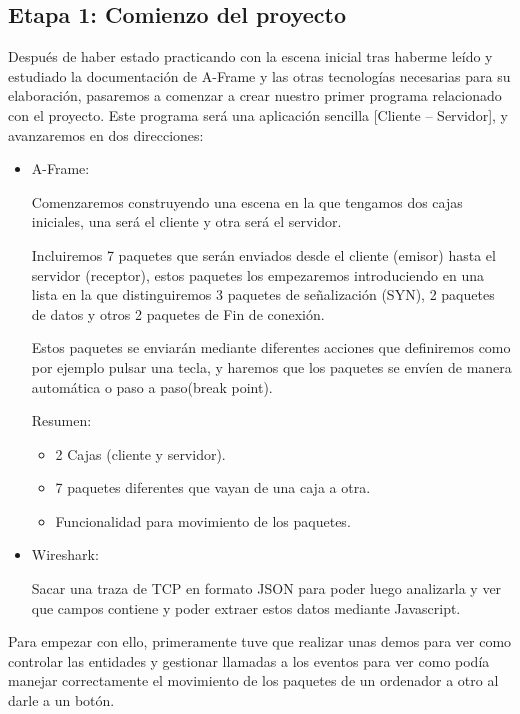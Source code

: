 \documentclass[a4paper, 12pt]{book}
\begin{document}
\newpage
\subsection{Etapa 1: Comienzo del proyecto}

Después de haber estado practicando con la escena inicial tras haberme leído y estudiado la documentación de A-Frame y las otras tecnologías necesarias para su elaboración, pasaremos a comenzar a crear nuestro primer programa relacionado con el proyecto.
Este programa será una aplicación sencilla [Cliente – Servidor], y avanzaremos en dos direcciones:

\begin{itemize}
\item    A-Frame:

Comenzaremos construyendo una escena en la que tengamos dos cajas iniciales, una será el cliente y otra será el servidor.

Incluiremos 7 paquetes que serán enviados desde el cliente (emisor) hasta el servidor (receptor), estos paquetes los empezaremos introduciendo en una lista en la que distinguiremos 3 paquetes de señalización (SYN), 2 paquetes de datos y otros 2 paquetes de Fin de conexión.

Estos paquetes se enviarán mediante diferentes acciones que definiremos como por ejemplo pulsar una tecla, y haremos que los paquetes se envíen de manera automática o paso a paso(break point).

Resumen:
\begin{itemize}
    \item 2 Cajas (cliente y servidor).
    \item 7 paquetes diferentes que vayan de una caja a otra.
    \item Funcionalidad para movimiento de los paquetes.
\end{itemize}


 \item Wireshark:

Sacar una traza de TCP en formato JSON para poder luego analizarla y ver que campos contiene y poder extraer estos datos mediante Javascript.

\end{itemize}

Para empezar con ello, primeramente tuve que realizar unas demos para ver como controlar las entidades y gestionar llamadas a los eventos para ver como podía manejar correctamente el movimiento de los paquetes de un ordenador a otro al darle a un botón.
\end{document}
